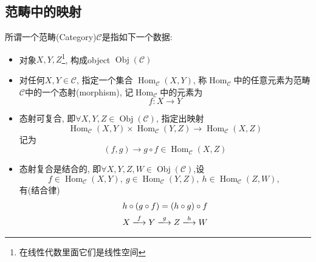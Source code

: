 
\subsection{范畴中的映射}

\begin{definition}
    所谓一个范畴(Category)$\mathcal{C}$是指如下一个数据:
    \begin{itemize}
        \item 对象$X,Y,Z$\footnote{在线性代数里面它们是线性空间}, 构成object $\operatorname{Obj}(\mathcal{C})$
        
        \item 对任何$X,Y \in \mathcal{C}$, 指定一个集合 $\operatorname{Hom}_{\mathcal{C}}(X,Y)$, 称$\operatorname{Hom}_{\mathcal{C}}$中的任意元素为范畴$\mathcal{C}$中的一个态射(morphism), 记$\operatorname{Hom}_{\mathcal{C}}$中的元素为
        \begin{equation}
          f\colon X\rightarrow Y
        \end{equation}

        \item 态射可复合, 即$\forall X,Y,Z \in \operatorname{Obj}(\mathcal{C}) $, 指定出映射
        \begin{equation}
          \operatorname{Hom}_{\mathcal{C}} (X,Y) \times \operatorname{Hom}_{\mathcal{C}}(Y,Z) \longrightarrow \operatorname{Hom}_{\mathcal{C}}(X,Z)
        \end{equation}
        记为
        \begin{equation}
          (f,g) \rightarrow g \circ f \in \operatorname{Hom}_{\mathcal{C}}(X,Z)
        \end{equation}

        \item 态射复合是结合的, 即$\forall X,Y,Z,W \in \operatorname{Obj}(\mathcal{C})$,设
        \begin{equation}
          f \in \operatorname{Hom}_{\mathcal{C}}(X,Y), \ 
          g \in \operatorname{Hom}_{\mathcal{C}}(Y,Z), \ 
          h \in \operatorname{Hom}_{\mathcal{C}}(Z,W), \ 
        \end{equation}
        有(结合律)
        \begin{gather}
            h \circ (g \circ f) = (h\circ g) \circ f
            \\
            X \xlongrightarrow{f} Y \xlongrightarrow{g} Z \xlongrightarrow{h} W
        \end{gather}


\end{itemize}
\end{definition}
